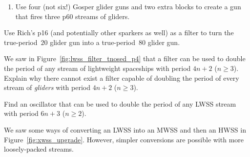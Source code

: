 \begin{multicols}{2}
\begin{problem}
\begin{enumerate}[label=\bf\color{ocre}(\alph*)]
			\item {} Use four (not six!) Gosper glider guns and two extra blocks to create a gun that fires three p$60$ streams of gliders.
		\end{enumerate}
	\end{problem}
	
	
	\mfilbreak
	
	
	\begin{problemstar}\label{exer:p80_gun_rich_p16} 
		Use Rich's p16 (and potentially other sparkers as well) as a filter to turn the true-period~$20$ glider gun into a true-period~$80$ glider gun.
		
	\end{problemstar}
	
	
	\mfilbreak
	
	
	\begin{problemstar}\label{exer:p4_glider_filter} 
		We saw in Figure~\ref{fig:lwss_filter_tnosed_p4} that a filter can be used to double the period of any stream of lightweight spaceships with period $4n+2$ ($n \geq 3$). Explain why there cannot exist a filter capable of doubling the period of every stream of \emph{gliders} with period $4n+2$ ($n \geq 3$).
	\end{problemstar}


	\mfilbreak
	
	
	\begin{problem}\label{exer:p6_lwss_filter} 
		Find an oscillator that can be used to double the period of any LWSS stream with period $6n+3$ ($n \geq 2$).
	\end{problem}


	\mfilbreak
	
	
	\begin{problem}\label{exer:lwss_to_hwss_upgrade} 
		We saw some ways of converting an LWSS into an MWSS and then an HWSS in Figure~\ref{fig:xwss_upgrade}. However, simpler conversions are possible with more loosely-packed streams.\smallskip
		

\end{problem}
\end{multicols}

